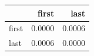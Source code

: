 \begin{tabular}{lrr}
\toprule
 & first & last \\
\midrule
first & 0.0000 & 0.0006 \\
last & 0.0006 & 0.0000 \\
\bottomrule
\end{tabular}

